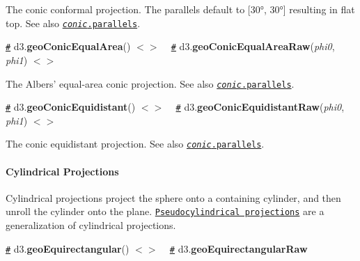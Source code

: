 The conic conformal projection. The parallels default to \mbox{[}30°, 30°\mbox{]} resulting in flat top. See also \href{#conic_parallels}{\tt {\itshape conic}.parallels}.

\href{#geoConicEqualArea}{\tt \#} d3.{\bfseries geo\+Conic\+Equal\+Area}() \href{https://github.com/d3/d3-geo/blob/master/src/projection/conicEqualArea.js}{\tt $<$$>$} ~\newline
\href{#geoConicEqualAreaRaw}{\tt \#} d3.{\bfseries geo\+Conic\+Equal\+Area\+Raw}({\itshape phi0}, {\itshape phi1}) \href{https://github.com/d3/d3-geo/blob/master/src/projection/conicEqualArea.js}{\tt $<$$>$}

\href{https://bl.ocks.org/mbostock/3734308}{\tt }

The Albers’ equal-\/area conic projection. See also \href{#conic_parallels}{\tt {\itshape conic}.parallels}.

\href{#geoConicEquidistant}{\tt \#} d3.{\bfseries geo\+Conic\+Equidistant}() \href{https://github.com/d3/d3-geo/blob/master/src/projection/conicEquidistant.js}{\tt $<$$>$} ~\newline
\href{#geoConicEquidistantRaw}{\tt \#} d3.{\bfseries geo\+Conic\+Equidistant\+Raw}({\itshape phi0}, {\itshape phi1}) \href{https://github.com/d3/d3-geo/blob/master/src/projection/conicEquidistant.js}{\tt $<$$>$}

\href{https://bl.ocks.org/mbostock/3734317}{\tt }

The conic equidistant projection. See also \href{#conic_parallels}{\tt {\itshape conic}.parallels}.

\paragraph*{Cylindrical Projections}

Cylindrical projections project the sphere onto a containing cylinder, and then unroll the cylinder onto the plane. \href{http://www.progonos.com/furuti/MapProj/Normal/ProjPCyl/projPCyl.html}{\tt Pseudocylindrical projections} are a generalization of cylindrical projections.

\href{#geoEquirectangular}{\tt \#} d3.{\bfseries geo\+Equirectangular}() \href{https://github.com/d3/d3-geo/blob/master/src/projection/equirectangular.js}{\tt $<$$>$} ~\newline
\href{#geoEquirectangularRaw}{\tt \#} d3.{\bfseries geo\+Equirectangular\+Raw}

\href{https://bl.ocks.org/mbostock/3757119}{\tt }

